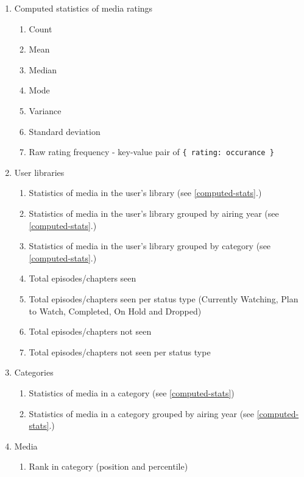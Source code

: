\begin{enumerate}
  \item\label{computed-stats} Computed statistics of media ratings%
    \begin{enumerate}
      \item Count
      \item Mean
      \item Median
      \item Mode
      \item Variance
      \item Standard deviation
      \item Raw rating frequency - key-value pair of \texttt{\{ rating: occurance \}}
    \end{enumerate}
  \item User libraries
    \begin{enumerate}
      \item Statistics of media in the user's library (see \ref{computed-stats}.)
      \item Statistics of media in the user's library grouped by airing year (see \ref{computed-stats}.)
      \item Statistics of media in the user's library grouped by category (see \ref{computed-stats}.)
      \item Total episodes/chapters seen
      \item Total episodes/chapters seen per status type (Currently Watching, Plan to Watch, Completed, On Hold and Dropped)
      \item Total episodes/chapters not seen
      \item Total episodes/chapters not seen per status type
    \end{enumerate}
  \item Categories
    \begin{enumerate}
      \item Statistics of media in a category (see \ref{computed-stats})
      \item Statistics of media in a category grouped by airing year (see \ref{computed-stats}.)
    \end{enumerate}
  \item Media
    \begin{enumerate}
      \item Rank in category (position and percentile)
    \end{enumerate}
\end{enumerate}

